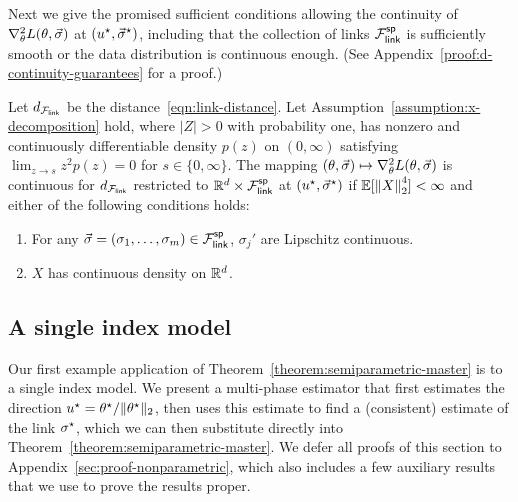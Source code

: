 Next we give the promised sufficient conditions allowing the continuity of $\nabla_\theta^2 L(\theta, \vec{\sigma})$ at $(u^\star, \vec{\sigma}^\star)$, including that the collection of links
$\mathcal{F}_{\mathsf{link}}^{\mathsf{sp}}$ is sufficiently smooth or the data distribution is continuous
enough. (See Appendix~\ref{proof:d-continuity-guarantees} for a proof.)

\begin{lemma} \label{lem:d-continuity-guarantees}
  Let $d_{\mathcal{F}_{\mathsf{link}}}$ be the distance~\eqref{eqn:link-distance}. Let
  Assumption~\ref{assumption:x-decomposition} hold, where $|Z| > 0$ with
  probability one, has nonzero and continuously differentiable density
  $p(z)$ on $(0, \infty)$ satisfying $\lim_{z \to s} z^2 p(z) = 0$ for $s
  \in \{0, \infty\}$. The mapping $(\theta, \vec{\sigma}) \mapsto
  \nabla_\theta^2 L(\theta, \vec{\sigma})$ is continuous for
  $d_{\mathcal{F}_{\mathsf{link}}}$ restricted to $\mathbb{R}^d \times \mathcal{F}_{\mathsf{link}}^{\mathsf{sp}}$ at $(u^\star,
  \vec{\sigma}^\star)$ if $\mathbb{E} [\left\|{X}\right\|_2^4] < \infty$ and either of the
  following conditions holds:
  \begin{enumerate}[leftmargin=2em,label=(C.\arabic*)]
  \item For any $\vec{\sigma} = (\sigma_1, \ldots, \sigma_m) \in
    \mathcal{F}_{\mathsf{link}}^{\mathsf{sp}}$, $\sigma_j'$ are Lipschitz continuous.
  \item $X$ has continuous density on $\mathbb{R}^d$.
  \end{enumerate}
\end{lemma}

\subsection{A single index model}
\label{sec:semiparametric}

Our first example application of Theorem~\ref{theorem:semiparametric-master}
is to a single index model. We present a multi-phase estimator that first
estimates the direction $u^\star = \theta^\star / \|{\theta^\star}\|_2$, then uses
this estimate to find a (consistent) estimate of the link $\sigma^\star$,
which we can then substitute directly into
Theorem~\ref{theorem:semiparametric-master}.
We defer all proofs of this section to Appendix~\ref{sec:proof-nonparametric},
which also includes a few auxiliary results that we use to prove the
results proper.

